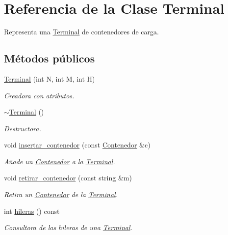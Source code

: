 \hypertarget{class_terminal}{}\section{Referencia de la Clase Terminal}
\label{class_terminal}


Representa una \hyperlink{class_terminal}{Terminal} de contenedores de carga.  


\subsection*{Métodos públicos}
\begin{DoxyCompactItemize}
\item 
\hyperlink{class_terminal_a696ee89f0fc7359b528c9f8f2aec064f}{Terminal} (int N, int M, int H)
\begin{DoxyCompactList}\small\item\em Creadora con atributos. \end{DoxyCompactList}\item 
\hyperlink{class_terminal_add5a7d4dd45b68af9a0afb1cc845af2f}{$\sim$\+Terminal} ()
\begin{DoxyCompactList}\small\item\em Destructora. \end{DoxyCompactList}\item 
void \hyperlink{class_terminal_a0448a45cc3dea91ab383c79246c9e50e}{insertar\+\_\+contenedor} (const \hyperlink{class_contenedor}{Contenedor} \&c)
\begin{DoxyCompactList}\small\item\em Añade un \hyperlink{class_contenedor}{Contenedor} a la \hyperlink{class_terminal}{Terminal}. \end{DoxyCompactList}\item 
void \hyperlink{class_terminal_a4a5b00174efb9993ead60369d206375b}{retirar\+\_\+contenedor} (const string \&m)
\begin{DoxyCompactList}\small\item\em Retira un \hyperlink{class_contenedor}{Contenedor} de la \hyperlink{class_terminal}{Terminal}. \end{DoxyCompactList}\item 
int \hyperlink{class_terminal_a6e7268ad5b0ffbf1484f1f1522e800f0}{hileras} () const
\begin{DoxyCompactList}\small\item\em Consultora de las hileras de una \hyperlink{class_terminal}{Terminal}. \end{DoxyCompactList}\item 

\end{DoxyCompactItemize}
